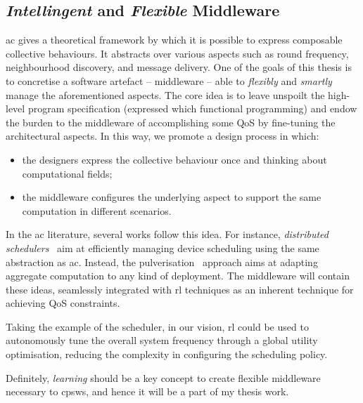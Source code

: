 \documentclass[11pt]{article}
\begin{document}
\subsection{\emph{Intellingent} and \emph{Flexible} Middleware}\label{middleware}
\ac{ac} gives a theoretical framework by which it is possible to express composable collective behaviours. It abstracts over various aspects such as round frequency, neighbourhood discovery, and message delivery.
One of the goals of this thesis is to concretise a software artefact -- middleware -- able to \emph{flexibly} and \emph{smartly} manage the aforementioned aspects.
%
The core idea is to leave unspoilt the high-level program specification (expressed which functional programming) and endow the burden to the middleware of accomplishing some QoS by fine-tuning the architectural aspects. 
%
In this way, we promote a design process in which:
\begin{itemize}
	\item the designers express the collective behaviour once and thinking about computational fields;
	\item the middleware configures the underlying aspect to support the same computation in different scenarios.
\end{itemize}

In the \ac{ac} literature, several works follow this idea. 
%
For instance, \emph{distributed schedulers}~\cite{DBLP:journals/corr/abs-2012-13806} aim at efficiently managing device scheduling using the same abstraction as \ac{ac}.
Instead, the pulverisation~\cite{DBLP:journals/fi/CasadeiPPVW20} approach aims at adapting aggregate computation to any kind of deployment.
%
The middleware will contain these ideas, seamlessly integrated with \ac{rl} techniques as an inherent technique for achieving  QoS constraints.

Taking the example of the scheduler, in our vision, \ac{rl} could be used to autonomously tune the overall system frequency through a global utility optimisation, reducing the complexity in configuring the scheduling policy.

Definitely, \emph{learning} should be a key concept to create flexible middleware necessary to \acp{cpsw}, and hence it will be a part of my thesis work. 



\end{document}
